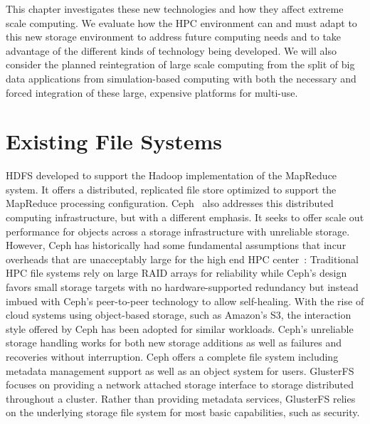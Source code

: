 This chapter investigates these new technologies and how they affect extreme
scale computing. We evaluate how the HPC environment can and must adapt to this
new storage environment to address future computing needs and to take advantage
of the different kinds of technology being developed. We will also consider the
planned reintegration of large scale computing from the split of big data
applications from simulation-based computing with both the necessary and forced
integration of these large, expensive platforms for multi-use.

\section{Existing File Systems}

HDFS developed to support the Hadoop implementation of the MapReduce system. It
offers a distributed, replicated file store optimized to support the MapReduce
processing configuration. Ceph~\cite{weil:2006:ceph} also addresses this
distributed computing infrastructure, but with a different emphasis. It seeks
to offer scale out performance for objects across a storage infrastructure with
unreliable storage.  However, Ceph has historically had some fundamental
assumptions that incur overheads that are unacceptably large for the high end
HPC center~\cite{wang:2013:ceph}: Traditional HPC file systems rely on large
RAID arrays for reliability while Ceph's design favors small storage targets
with no hardware-supported redundancy but instead imbued with Ceph's
peer-to-peer technology to allow self-healing.  With the rise of cloud systems
using object-based storage, such as Amazon's S3, the interaction style offered
by Ceph has been adopted for similar workloads. Ceph's unreliable storage
handling works for both new storage additions as well as failures and
recoveries without interruption. Ceph offers a complete file system including
metadata management support as well as an object system for users.
GlusterFS~\cite{boyer:2012:glusterfs} focuses on providing a network attached
storage interface to storage distributed throughout a cluster.  Rather than
providing metadata services, GlusterFS relies on the underlying storage file
system for most basic capabilities, such as security.

